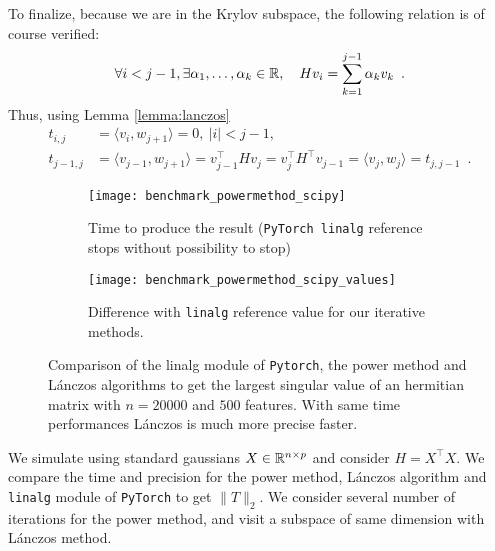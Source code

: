 \documentclass[../main.tex]{subfiles}
\begin{document}
To finalize, because we are in the Krylov subspace, the following relation is of
course verified:
\[\forall i < j-1,\exists \alpha_1, \dots, \alpha_k \in \mathbb{R},\quad Hv_i =
\sum_{k=1}^{j-1} \alpha_k v_k\enspace. \]
Thus, using Lemma \ref{lemma:lanczos}
\begin{align*}
	t_{i, j} &= \langle v_i, w_{j+1}\rangle = 0,\ |i|<j-1,\\
	t_{j-1, j} &= \langle v_{j-1}, w_{j+1}\rangle = v_{j-1}^\top H v_{j}
	= v_{j}^\top H^\top v_{j-1} = \langle v_j, w_j\rangle = t_{j, j-1}
	\enspace.
\end{align*}
\begin{figure}[!h]
	\begin{subfigure}{.45\textwidth}
		\centering
		\texttt{[image: benchmark\_powermethod\_scipy]}
		\caption{Time to produce the result (\texttt{PyTorch linalg} reference stops without
		possibility to stop)}
	\end{subfigure}\hfill
	\begin{subfigure}{.45\textwidth}
		\centering
		\texttt{[image: benchmark\_powermethod\_scipy\_values]}
		\caption{Difference with \texttt{linalg} reference value for our
		 iterative methods.}
	\end{subfigure}
	\caption{
	Comparison of the linalg module of \texttt{Pytorch}, the power
	method and L\'{a}nczos algorithms to get the largest singular value of an
	hermitian matrix with $n=20000$ and $500$ features.
	With same time performances L\'{a}nczos is much more precise faster.}
	\label{fig:lanczos}
\end{figure}
We simulate using standard gaussians $X \in \mathbb{R}^{n\times p}$ and
consider $H=X^\top X$.
We compare the time and precision for the power method, L\'{a}nczos algorithm
and \texttt{linalg} module of \texttt{PyTorch} to get $\|T\|_2$.
We consider several number of iterations for the power method,
and visit a subspace of same dimension with L\'{a}nczos method.
%
\end{document}
